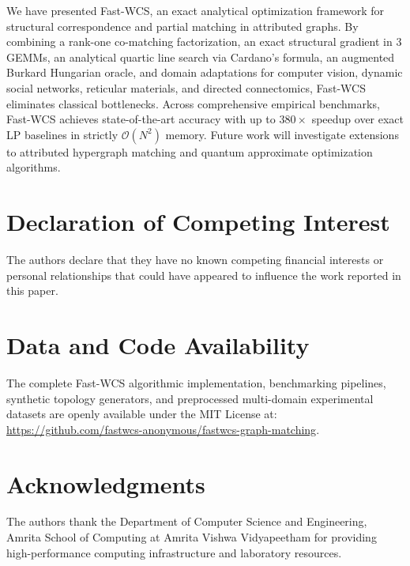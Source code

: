 \documentclass[a4paper,fleqn]{cas-dc}
\theoremstyle{thmstyleone}
\theoremstyle{thmstyletwo}
\theoremstyle{thmstylethree}
\begin{document}
We have presented Fast-WCS, an exact analytical optimization framework for structural correspondence and partial matching in attributed graphs. By combining a rank-one co-matching factorization, an exact structural gradient in 3 GEMMs, an analytical quartic line search via Cardano's formula, an augmented Burkard Hungarian oracle, and domain adaptations for computer vision, dynamic social networks, reticular materials, and directed connectomics, Fast-WCS eliminates classical bottlenecks. Across comprehensive empirical benchmarks, Fast-WCS achieves state-of-the-art accuracy with up to $380\times$ speedup over exact LP baselines in strictly $\mathcal{O}(N^2)$ memory. Future work will investigate extensions to attributed hypergraph matching and quantum approximate optimization algorithms.

\section*{Declaration of Competing Interest}
The authors declare that they have no known competing financial interests or personal relationships that could have appeared to influence the work reported in this paper.

\section*{Data and Code Availability}
The complete Fast-WCS algorithmic implementation, benchmarking pipelines, synthetic topology generators, and preprocessed multi-domain experimental datasets are openly available under the MIT License at: \url{https://github.com/fastwcs-anonymous/fastwcs-graph-matching}.

\section*{Acknowledgments}
The authors thank the Department of Computer Science and Engineering, Amrita School of Computing at Amrita Vishwa Vidyapeetham for providing high-performance computing infrastructure and laboratory resources.
\end{document}

